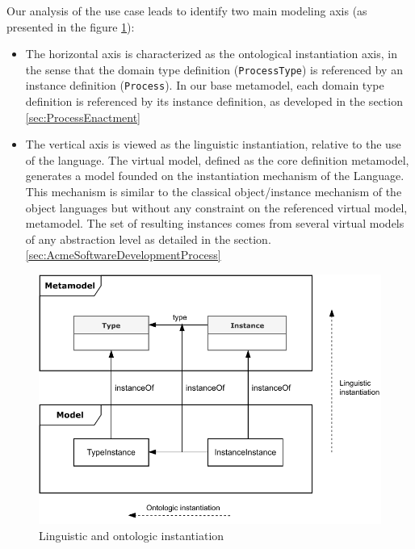 Our analysis of the use case leads to identify two main modeling axis (as presented in the figure \ref{fig:LinguisticAndOntologicInstantiation}):
\begin{itemize}
    \item The horizontal axis is characterized as the ontological instantiation axis, in the sense that the domain type definition (\ie \texttt{ProcessType}) is referenced by an instance definition (\ie \texttt{Process}). In our base metamodel, each domain type definition is referenced by its instance definition, as developed in the section \ref{sec:ProcessEnactment}

\item The vertical axis is viewed as the linguistic instantiation, relative to the use of the \FML language. The virtual model, defined as the core definition metamodel, generates a model founded on the instantiation mechanism of the \FML Language. This mechanism is similar to the classical object/instance mechanism of the object languages but without any constraint on the referenced virtual model, \ie metamodel. The set of resulting instances comes from several virtual models
of any abstraction level as detailed in the section. \ref{sec:AcmeSoftwareDevelopmentProcess}


\end{itemize}

\begin{figure}
    \centering
    \includegraphics[width=1.0 \columnwidth]{Figures/Instantiation.pdf}
    \caption{Linguistic and ontologic instantiation}
    \label{fig:LinguisticAndOntologicInstantiation}
\end{figure}

